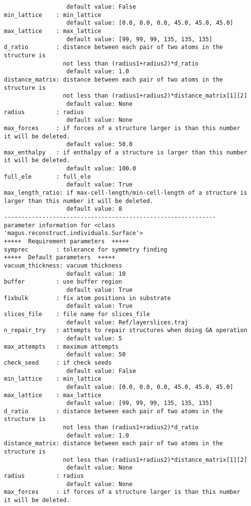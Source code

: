 \documentclass[12pt,oneside]{book}
\begin{document}
\begin{tcolorbox}
\begin{verbatim}
                  default value: False
min_lattice    : min_lattice
                  default value: [0.0, 0.0, 0.0, 45.0, 45.0, 45.0]
max_lattice    : max_lattice
                  default value: [99, 99, 99, 135, 135, 135]
d_ratio        : distance between each pair of two atoms in the structure is
                 not less than (radius1+radius2)*d_ratio
                  default value: 1.0
distance_matrix: distance between each pair of two atoms in the structure is
                 not less than (radius1+radius2)*distance_matrix[1][2]
                  default value: None
radius         : radius
                  default value: None
max_forces     : if forces of a structure larger is than this number it will be deleted.
                  default value: 50.0
max_enthalpy   : if enthalpy of a structure is larger than this number it will be deleted.
                  default value: 100.0
full_ele       : full_ele
                  default value: True
max_length_ratio: if max-cell-length/min-cell-length of a structure is larger than this number it will be deleted.
                  default value: 8
-------------------------------------------------------------
parameter information for <class 'magus.reconstruct.individuals.Surface'>
+++++  Requirement parameters  +++++
symprec        : tolerance for symmetry finding
+++++  Default parameters  +++++
vacuum_thickness: vacuum thickness
                  default value: 10
buffer         : use buffer region
                  default value: True
fixbulk        : fix atom positions in substrate
                  default value: True
slices_file    : file name for slices_file
                  default value: Ref/layerslices.traj
n_repair_try   : attempts to repair structures when doing GA operation
                  default value: 5
max_attempts   : maximum attempts
                  default value: 50
check_seed     : if check seeds
                  default value: False
min_lattice    : min_lattice
                  default value: [0.0, 0.0, 0.0, 45.0, 45.0, 45.0]
max_lattice    : max_lattice
                  default value: [99, 99, 99, 135, 135, 135]
d_ratio        : distance between each pair of two atoms in the structure is
                 not less than (radius1+radius2)*d_ratio
                  default value: 1.0
distance_matrix: distance between each pair of two atoms in the structure is
                 not less than (radius1+radius2)*distance_matrix[1][2]
                  default value: None
radius         : radius
                  default value: None
max_forces     : if forces of a structure larger is than this number it will be deleted.

\end{verbatim}
\end{tcolorbox}
\end{document}
